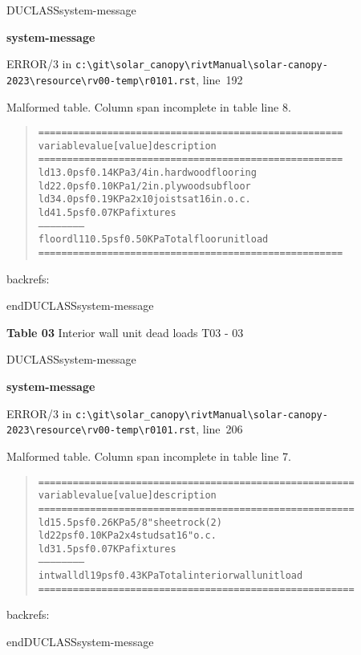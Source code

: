 \documentclass[12pt,notitle,letterpaper]{report}
\newenvironment{DUclass}[1]%
  {%
   \def\DocutilsClassFunctionName{DUCLASS#1}
     \csname \DocutilsClassFunctionName \endcsname}%
  {\csname end\DocutilsClassFunctionName \endcsname}%
\newenvironment{DUadmonition}%
  {\begin{center}
     \begin{lrbox}{\DUadmonitionbox}
       \begin{minipage}{0.9\linewidth}
  }%
  {    \end{minipage}
     \end{lrbox}
     \fbox{\usebox{\DUadmonitionbox}}
   \end{center}
  }
\newenvironment{DUlineblock}[1]{%
    \list{}{\setlength{\partopsep}{\parskip}
            \addtolength{\partopsep}{\baselineskip}
            \setlength{\topsep}{0pt}
            \setlength{\itemsep}{0.15\baselineskip}
            \setlength{\parsep}{0pt}
            \setlength{\leftmargin}{#1}}
    \raggedright
  }
  {\endlist}
\providecommand*{\DUtitle}[1]{%
  \smallskip\noindent\textbf{#1}\smallskip}
\begin{document}
\begin{DUclass}{system-message}
\begin{DUadmonition}
\DUtitle{system-message
}

{\color{red}ERROR/3} in \texttt{c:\textbackslash{}git\textbackslash{}solar\_canopy\textbackslash{}rivtManual\textbackslash{}solar-canopy-2023\textbackslash{}resource\textbackslash{}rv00-temp\textbackslash{}r0101.rst}, line~192

Malformed table.
Column span incomplete in table line 8.

\begin{quote}
\begin{alltt}
==========  ========  =========  ==========================
variable       value    [value]  description
==========  ========  =========  ==========================
ld1          3.0 psf   0.14 KPa  3/4 in. hardwood flooring
ld2          2.0 psf   0.10 KPa  1/2 in. plywood subfloor
ld3          4.0 psf   0.19 KPa  2x10 joists at 16 in. o.c.
ld4          1.5 psf   0.07 KPa  fixtures
------        ------     ------  ------
floordl1    10.5 psf   0.50 KPa  Total floor unit load
==========  ========  =========  ==========================
\end{alltt}
\end{quote}
backrefs: \end{DUadmonition}
\end{DUclass}

\begin{DUlineblock}{0em}
\item[] 
\end{DUlineblock}

\textbf{Table 03} Interior wall unit dead loads \hfill T03 - 03

\begin{DUclass}{system-message}
\begin{DUadmonition}
\DUtitle{system-message
}

{\color{red}ERROR/3} in \texttt{c:\textbackslash{}git\textbackslash{}solar\_canopy\textbackslash{}rivtManual\textbackslash{}solar-canopy-2023\textbackslash{}resource\textbackslash{}rv00-temp\textbackslash{}r0101.rst}, line~206

Malformed table.
Column span incomplete in table line 7.

\begin{quote}
\begin{alltt}
==========  =======  =========  =============================
variable      value    [value]  description
==========  =======  =========  =============================
ld1         5.5 psf   0.26 KPa  5/8" sheet rock (2)
ld2           2 psf   0.10 KPa  2x4 studs at 16" o.c.
ld3         1.5 psf   0.07 KPa  fixtures
------       ------     ------  ------
intwalldl1    9 psf   0.43 KPa  Total interior wall unit load
==========  =======  =========  =============================
\end{alltt}
\end{quote}
backrefs: \end{DUadmonition}
\end{DUclass}
\end{document}
